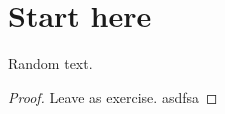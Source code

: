 

\section{Start here}
\begin{theorem}
Random text.
\end{theorem}

\begin{proof}
    Leave as exercise. asdfsa
\end{proof}
